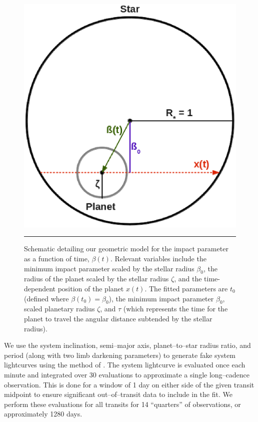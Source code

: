 \begin{figure}[t] 
  \begin{minipage}[c]{0.37\textwidth}
    \includegraphics[width=\textwidth]{figures/schem.eps}
  \end{minipage}\hfill
  \begin{minipage}[c]{0.6\textwidth}
    \caption{Schematic detailing our geometric model for the impact
      parameter as a function of time, $\beta(t)$.  Relevant variables
      include the minimum impact parameter scaled by the stellar radius
      $\beta_0$, the radius of the planet scaled by the stellar radius
      $\zeta$, and the time-dependent position of the planet $x(t)$.  The
      fitted parameters are $t_0$ (defined where $\beta(t_0) = \beta_0$),
      the minimum impact parameter $\beta_0$, scaled planetary radius
      $\zeta$, and $\tau$ (which represents the time for the planet to
      travel the angular distance subtended by the stellar radius). }
    \label{fig-schem}
    \hspace*{\fill}  
    \hrule
  \end{minipage}
\end{figure}

\medskip
{\centerline{}}
\smallskip

We use the system inclination, semi--major axis, planet--to--star
radius ratio, and period (along with two limb darkening parameters) to
generate fake system lightcurves using the method of
\cite{2002ApJ...580L.171M}.  The system lightcurve is evaluated once
each minute and integrated over 30 evaluations to approximate a single
\kepler long--cadence observation.  This is done for a window of 1 day
on either side of the given transit midpoint to ensure significant
out--of--transit data to include in the fit.  We perform these
evaluations for all transits for 14 ``quarters'' of \kepler
observations, or approximately 1280 days.

